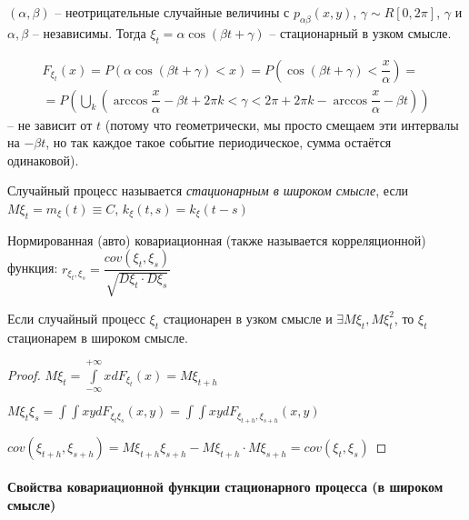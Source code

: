 \begin{ex}
  $(\alpha, \beta)$ -- неотрицательные случайные величины с $p_{\alpha\beta} (x, y)$,
  $\gamma\sim R[0, 2\pi]$, $\gamma$ и $\alpha,\beta$ -- независимы.
  Тогда $\xi_t = \alpha \cos(\beta t + \gamma)$ -- стационарный в узком смысле.

  \begin{multline*}
    F_{\xi_t}(x)
    = P(\alpha \cos(\beta t + \gamma) < x)
    = P(\cos(\beta t + \gamma) < \dfrac{x}{\alpha}) = \\
    = P\left( \bigcup_k \left( \arccos\dfrac{x}{\alpha} - \beta t + 2\pi k < \gamma < 2\pi +2\pi k - \arccos\dfrac{x}{\alpha} - \beta t \right) \right)
  \end{multline*}
  -- не зависит от $t$ (потому что геометрически, мы просто смещаем эти интервалы на $-\beta t$,
  но так каждое такое событие периодическое, сумма остаётся одинаковой).
  
\end{ex}

\begin{definition}
  Случайный процесс называется \emph{стационарным в широком смысле}, если 
  $M\xi_t = m_\xi(t) \equiv C$, $k_\xi(t, s) = k_\xi(t-s)$
\end{definition}

\begin{definition}
  Нормированная (авто) ковариационная (также называется корреляционной) функция:
  $r_{\xi_t, \xi_s} = \dfrac{cov(\xi_t, \xi_s)}{\sqrt{D\xi_t \cdot D\xi_s}}$
\end{definition}

\begin{theorem}
  Если случайный процесс $\xi_t$ стационарен в узком смысле и $\exists M\xi_t, M\xi^2_t$, 
  то $\xi_t$ стационарем в широком смысле.
\end{theorem}
\begin{proof}
  $M\xi_t = \int\limits_{-\infty}^{+\infty} x dF_{\xi_t} (x) = M\xi_{t+h}$

  $M\xi_t \xi_s = \int\int xy dF_{\xi_t \xi_s} (x, y) = \int\int xy dF_{\xi_{t+h}, \xi_{s+h}} (x, y)$

  $cov(\xi_{t+h}, \xi_{s+h}) = M\xi_{t+h} \xi_{s+h} - M\xi_{t+h} \cdot M\xi_{s+h} = cov(\xi_t, \xi_s)$
\end{proof}



\paragraph{Свойства ковариационной функции стационарного процесса (в широком смысле)}

